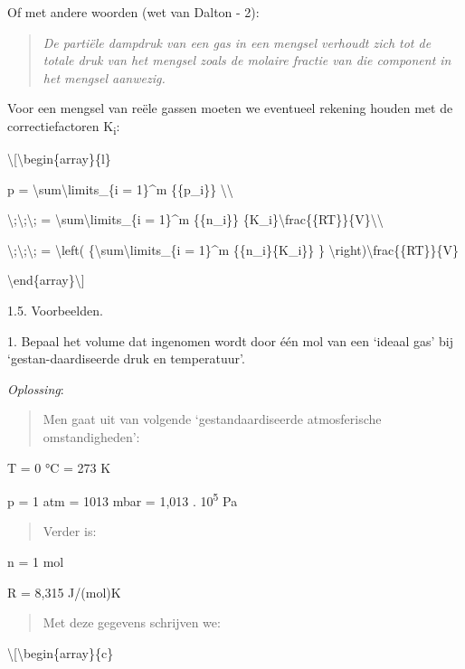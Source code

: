 \documentclass[]{article}
\begin{document}
Of met andere woorden (wet van Dalton - 2):

\begin{quote}
\emph{De partiële dampdruk van een gas in een mengsel verhoudt zich tot
de totale druk van het mengsel zoals de molaire fractie van die
component in het mengsel aanwezig.}
\end{quote}

Voor een mengsel van reële gassen moeten we eventueel rekening houden
met de correctiefactoren K\textsubscript{i}:

\textbackslash{}{[}\textbackslash{}begin\{array\}\{l\}

p = \textbackslash{}sum\textbackslash{}limits\_\{i = 1\}\^{}m
\{\{p\_i\}\} \textbackslash{}\textbackslash{}

\textbackslash{};\textbackslash{};\textbackslash{}; =
\textbackslash{}sum\textbackslash{}limits\_\{i = 1\}\^{}m \{\{n\_i\}\}
\{K\_i\}\textbackslash{}frac\{\{RT\}\}\{V\}\textbackslash{}\textbackslash{}

\textbackslash{};\textbackslash{};\textbackslash{}; =
\textbackslash{}left( \{\textbackslash{}sum\textbackslash{}limits\_\{i =
1\}\^{}m \{\{n\_i\}\{K\_i\}\} \}
\textbackslash{}right)\textbackslash{}frac\{\{RT\}\}\{V\}

\textbackslash{}end\{array\}\textbackslash{}{]}

1.5. Voorbeelden.

1. Bepaal het volume dat ingenomen wordt door één mol van een `ideaal
gas' bij `gestan-daardiseerde druk en temperatuur'.

\emph{Oplossing}:

\begin{quote}
Men gaat uit van volgende `gestandaardiseerde atmosferische
omstandigheden':
\end{quote}

T = 0 °C = 273 K

p = 1 atm = 1013 mbar = 1,013 . 10\textsuperscript{5} Pa

\begin{quote}
Verder is:
\end{quote}

n = 1 mol

R = 8,315 J/(mol)K

\begin{quote}
Met deze gegevens schrijven we:
\end{quote}

\textbackslash{}{[}\textbackslash{}begin\{array\}\{c\}
\end{document}
